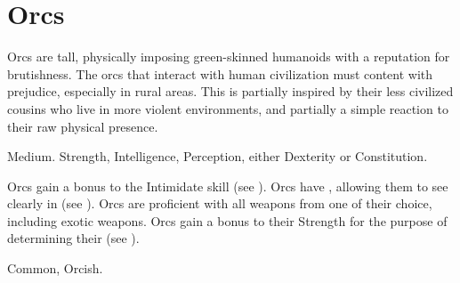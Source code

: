 \section{Orcs}

  Orcs are tall, physically imposing green-skinned humanoids with a reputation for brutishness.
  The orcs that interact with human civilization must content with prejudice, especially in rural areas.
  This is partially inspired by their less civilized cousins who live in more violent environments, and partially a simple reaction to their raw physical presence.

   Medium.
    Strength,  Intelligence,  Perception, either  Dexterity or  Constitution.
  \begin{raggeditemize}
     Orcs gain a  bonus to the Intimidate skill (see ).
     Orcs have , allowing them to see clearly in  (see ).
     Orcs are proficient with all weapons from one  of their choice, including exotic weapons.
     Orcs gain a  bonus to their Strength for the purpose of determining their  (see ).
  \end{raggeditemize}
   Common, Orcish.
